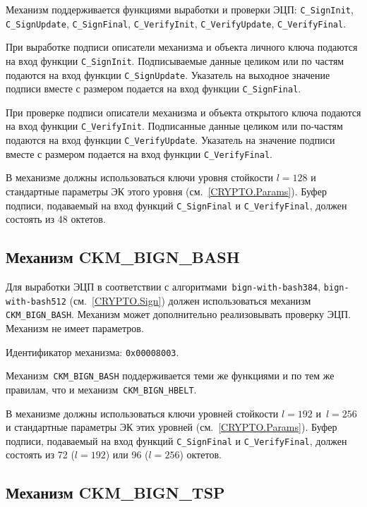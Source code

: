 Механизм поддерживается функциями выработки и проверки ЭЦП: 
\verb|C_SignInit|, \verb|C_SignUpdate|, \verb|C_SignFinal|, 
\verb|C_VerifyInit|, \verb|C_VerifyUpdate|, \verb|C_VerifyFinal|.

При выработке подписи описатели механизма и объекта
личного ключа подаются на вход функции \verb|C_SignInit|.
Подписываемые данные целиком или по частям подаются
на вход функции \verb|C_SignUpdate|.
Указатель на выходное значение подписи вместе с размером
подается на вход функции \verb|C_SignFinal|.

При проверке подписи описатели механизма и объекта
открытого ключа подаются на вход функции \verb|C_VerifyInit|.
Подписанные данные целиком или по-частям подаются
на вход функции \verb|C_VerifyUpdate|.
Указатель на значение подписи вместе с размером
подается на вход функции \verb|C_VerifyFinal|.

В механизме должны использоваться ключи уровня стойкости $l=128$ 
и стандартные параметры ЭК этого уровня (см.~\ref{CRYPTO.Params}).
% 
Буфер подписи, подаваемый на вход функций \verb|C_SignFinal| и 
\verb|C_VerifyFinal|, должен состоять из 48 октетов.

\subsection{Механизм CKM\_BIGN\_BASH}

Для выработки ЭЦП в соответствии с алгоритмами~\texttt{bign-with-bash384},
\texttt{bign-with-bash512} (см.~\ref{CRYPTO.Sign}) должен использоваться 
механизм \verb|CKM_BIGN_BASH|. Механизм может дополнительно реализовывать 
проверку ЭЦП.
%
Механизм не имеет параметров.

Идентификатор механизма: \texttt{0x00008003}.

Механизм~\verb|CKM_BIGN_BASH| поддерживается теми же функциями и по тем же 
правилам, что и механизм~\verb|CKM_BIGN_HBELT|.

В механизме должны использоваться ключи уровней стойкости $l=192$ и~$l=256$
и стандартные параметры ЭК этих уровней (см.~\ref{CRYPTO.Params}).
% 
Буфер подписи, подаваемый на вход функций \verb|C_SignFinal| и 
\verb|C_VerifyFinal|, должен состоять из 72 ($l=192$) или 96 ($l=256$) 
октетов. 

\subsection{Механизм CKM\_BIGN\_TSP}



